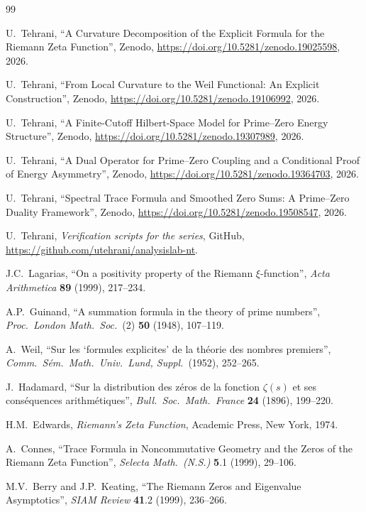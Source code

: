 \documentclass[11pt]{article}
\begin{document}
\newpage
\begin{thebibliography}{99}

U.~Tehrani,
``A Curvature Decomposition of the Explicit Formula
for the Riemann Zeta Function'',
Zenodo, \url{https://doi.org/10.5281/zenodo.19025598}, 2026.

U.~Tehrani,
``From Local Curvature to the Weil Functional:
An Explicit Construction'',
Zenodo, \url{https://doi.org/10.5281/zenodo.19106992}, 2026.

U.~Tehrani,
``A Finite-Cutoff Hilbert-Space Model
for Prime--Zero Energy Structure'',
Zenodo, \url{https://doi.org/10.5281/zenodo.19307989}, 2026.

U.~Tehrani,
``A Dual Operator for Prime--Zero Coupling
and a Conditional Proof of Energy Asymmetry'',
Zenodo, \url{https://doi.org/10.5281/zenodo.19364703}, 2026.

U.~Tehrani,
``Spectral Trace Formula and Smoothed Zero Sums:
A Prime--Zero Duality Framework'',
Zenodo, \url{https://doi.org/10.5281/zenodo.19508547}, 2026.

U.~Tehrani,
\emph{Verification scripts for the series},
GitHub, \url{https://github.com/utehrani/analysislab-nt}.

J.C.~Lagarias,
``On a positivity property of the Riemann $\xi$-function'',
\emph{Acta Arithmetica} \textbf{89} (1999), 217--234.

A.P.~Guinand,
``A summation formula in the theory of prime numbers'',
\emph{Proc.\ London Math.\ Soc.}\ (2) \textbf{50} (1948), 107--119.

A.~Weil,
``Sur les `formules explicites' de la th\'eorie des nombres
premiers'',
\emph{Comm.\ S\'em.\ Math.\ Univ.\ Lund, Suppl.}\ (1952), 252--265.

J.~Hadamard,
``Sur la distribution des z\'eros de la fonction $\zeta(s)$
et ses cons\'equences arithm\'etiques'',
\emph{Bull.\ Soc.\ Math.\ France} \textbf{24} (1896), 199--220.

H.M.~Edwards,
\emph{Riemann's Zeta Function},
Academic Press, New York, 1974.

A.~Connes,
``Trace Formula in Noncommutative Geometry and the Zeros of the
Riemann Zeta Function'',
\emph{Selecta Math.\ (N.S.)} \textbf{5}.1 (1999), 29--106.

M.V.~Berry and J.P.~Keating,
``The Riemann Zeros and Eigenvalue Asymptotics'',
\emph{SIAM Review} \textbf{41}.2 (1999), 236--266.


\end{thebibliography}
\end{document}
